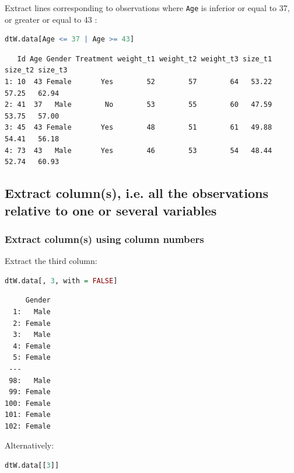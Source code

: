 \documentclass{article}
\begin{document}
Extract lines corresponding to observations where \texttt{Age} is inferior or
equal to 37, or greater or equal to 43 :
\begin{lstlisting}[language=r,numbers=none]
dtW.data[Age <= 37 | Age >= 43]
\end{lstlisting}

\label{}
\begin{verbatim}
   Id Age Gender Treatment weight_t1 weight_t2 weight_t3 size_t1 size_t2 size_t3
1: 10  43 Female       Yes        52        57        64   53.22   57.25   62.94
2: 41  37   Male        No        53        55        60   47.59   53.75   57.00
3: 45  43 Female       Yes        48        51        61   49.88   54.41   56.18
4: 73  43   Male       Yes        46        53        54   48.44   52.74   60.93
\end{verbatim}
\subsection{Extract column(s), i.e. all the observations relative to one or several variables}
\label{sec:org8abf657}

\subsubsection{Extract column(s) using column numbers}
\label{sec:org4b40757}

Extract the third column:
\begin{lstlisting}[language=r,numbers=none]
dtW.data[, 3, with = FALSE]
\end{lstlisting}

\label{}
\begin{verbatim}
     Gender
  1:   Male
  2: Female
  3:   Male
  4: Female
  5: Female
 ---       
 98:   Male
 99: Female
100: Female
101: Female
102: Female
\end{verbatim}

Alternatively:
\begin{lstlisting}[language=r,numbers=none]
dtW.data[[3]]
\end{lstlisting}
\end{document}
